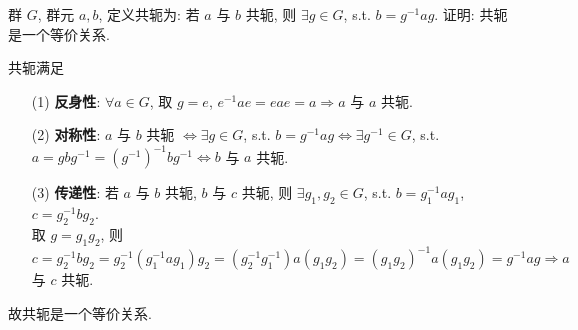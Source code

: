 \documentclass{assignment}
\begin{document}
\begin{prob}
    群 $G$, 群元 $a,b$, 定义共轭为: 若 $a$ 与 $b$ 共轭, 则 $\exists g\in G$, s.t. $b=g^{-1}ag$. 证明: 共轭是一个等价关系.
\end{prob}
\begin{pf}
    共轭满足
    \begin{itemize}
        \item[(1)] \textbf{反身性}: $\forall a\in G$, 取 $g=e$, $e^{-1}ae=eae=a\Longrightarrow a$ 与 $a$ 共轭.
        \item[(2)] \textbf{对称性}: $a$ 与 $b$ 共轭 $\Longleftrightarrow\exists g\in G$, s.t. $b=g^{-1}ag\Longleftrightarrow\exists g^{-1}\in G$, s.t. $a=gbg^{-1}=(g^{-1})^{-1}bg^{-1}\Longleftrightarrow b$ 与 $a$ 共轭.
        \item[(3)] \textbf{传递性}: 若 $a$ 与 $b$ 共轭, $b$ 与 $c$ 共轭, 则 $\exists g_1,g_2\in G$, s.t. $b=g_1^{-1}ag_1$, $c=g_2^{-1}bg_2$.\\
        取 $g=g_1g_2$, 则 $c=g_2^{-1}bg_2=g_2^{-1}(g_1^{-1}ag_1)g_2=(g_2^{-1}g_1^{-1})a(g_1g_2)=(g_1g_2)^{-1}a(g_1g_2)=g^{-1}ag\Longrightarrow a$ 与 $c$ 共轭.
    \end{itemize}
    故共轭是一个等价关系.
\end{pf}
\end{document}
